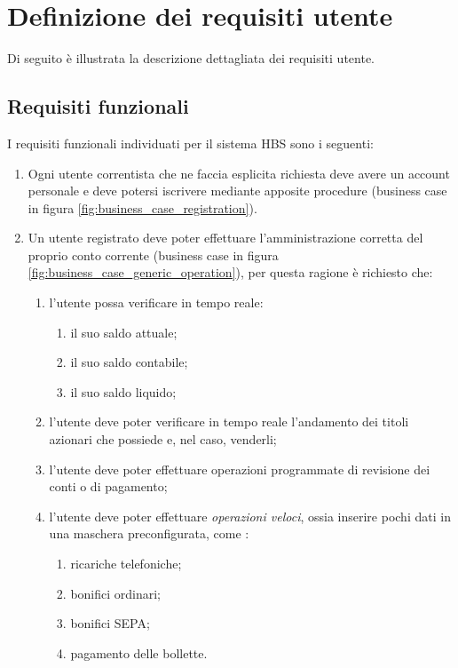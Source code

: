 
\section{Definizione dei requisiti utente}

Di seguito \`e illustrata la descrizione dettagliata dei requisiti utente.

\subsection{Requisiti funzionali}

I requisiti funzionali individuati per il sistema HBS sono i seguenti:

\begin{enumerate}
	\item \label{itm:iscrizione_utente} Ogni utente correntista che ne faccia esplicita richiesta deve avere un account personale e deve potersi iscrivere  mediante apposite procedure (business case in figura \ref{fig:business_case_registration}).
	\item Un utente registrato deve poter effettuare l'amministrazione corretta del proprio conto corrente (business case in figura \ref{fig:business_case_generic_operation}), per questa ragione è richiesto che:
	\begin{enumerate}
		\item l'utente possa verificare in tempo reale:
			\begin{enumerate}
				\item il suo saldo attuale;
				\item il suo saldo contabile;
				\item il suo saldo liquido;
			\end{enumerate} 
		\item l'utente deve poter verificare in tempo reale l'andamento dei titoli azionari che possiede e, nel caso, venderli;
		\item l'utente deve poter effettuare operazioni programmate di revisione dei conti o di pagamento;
		\item l'utente deve poter effettuare \emph{operazioni veloci}, ossia inserire pochi dati in una maschera preconfigurata, come :
			\begin{enumerate}
				\item ricariche telefoniche;
				\item bonifici ordinari;
				\item bonifici SEPA;
				\item pagamento delle bollette.

\end{enumerate}
\end{enumerate}
\end{enumerate}
